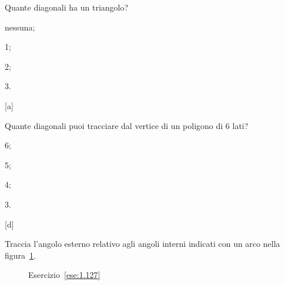 \begin{esercizio}
\label{ese:1.125}
Quante diagonali ha un triangolo?
\begin{multicols}{4}
\begin{enumeratea}
\item nessuna;
\item 1;
\item 2;
\item 3.
\end{enumeratea}
\end{multicols}
\hfill[a]
\end{esercizio}

\begin{esercizio}
\label{ese:1.126}
Quante diagonali puoi tracciare dal vertice di un poligono di 6 lati?
\begin{multicols}{4}
\begin{enumeratea}
\item 6;
\item 5;
\item 4;
\item 3.
\end{enumeratea}
\end{multicols}
\hfill[d]
\end{esercizio}

\begin{esercizio}
\label{ese:1.127}
Traccia l'angolo esterno relativo agli angoli interni indicati con un 
arco nella figura~\ref{fig:ese1.127}.
\end{esercizio}


\begin{inaccessibleblock}
 \begin{figure}[htb]
 \centering
 \caption{Esercizio~\ref{ese:1.127}}\label{fig:ese1.127}
\end{figure}
\end{inaccessibleblock}

